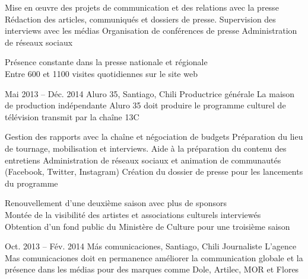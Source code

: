 \documentclass[30pt, french]{tccv}
\begin{document}
\begin{upshape}
\begin{experience}
    \setlength{\parskip}{-10pt}
    \begin{itemize}
      \setlength\itemsep{-3pt} 
      \cvitem[\checkmark] Mise en œuvre des projets de communication et des relations avec la presse
      \cvitem[\checkmark] Rédaction des articles, communiqués et dossiers de presse. Supervision des interviews avec les médias
      \cvitem[\checkmark] Organisation de conférences de presse
      \cvitem[\checkmark] Administration de réseaux sociaux
    \end{itemize}     
 Présence constante dans la presse nationale et régionale  \\
\mission{}          Entre 600 et 1100 visites quotidiennes sur le site web 
    
    
    
\setlength{\parskip}{0pt}        
\item{Mai 2013 -- Déc. 2014}
     {Aluro 35, Santiago, Chili}
     {Productrice générale}
     \fontsize{9pt}{1em}\color{text}\bodyfontlight\upshape\selectfont
%
 La maison de production indépendante Aluro 35 doit produire le programme culturel de télévision  transmit par la chaîne 13C \\
    
    \setlength{\parskip}{-10pt}
    \begin{itemize}
      \setlength\itemsep{-3pt} 
      \cvitem[\checkmark] Gestion des rapports avec la chaîne et négociation de budgets                       
      \cvitem[\checkmark] Préparation du lieu de tournage, mobilisation et interviews. Aide à la préparation du contenu des entretiens 
      \cvitem[\checkmark] Administration de réseaux sociaux et animation de communautés (Facebook, Twitter, Instagram)                 
      \cvitem[\checkmark] Création du dossier de presse pour les lancements du programme                                               
    \end{itemize}     
 Renouvellement d'une deuxième saison avec plus de sponsors \\
\mission{}	       Montée de la visibilité des artistes et associations culturels interviewés \\
\mission{}           Obtention d’un fond public du Ministère de Culture pour une troisième saison  \\




\setlength{\parskip}{0pt}    
\item{Oct. 2013 -- Fév. 2014 }     
  {Más comunicaciones, Santiago, Chili}     
  {Journaliste}
     \fontsize{9pt}{1em}\color{text}\bodyfontlight\upshape\selectfont
%    
 L’agence Mas comunicaciones doit en permanence améliorer la communication globale et la présence dans les médias
pour des marques comme Dole, Artilec, MOR et Flores\\


\end{experience}
\end{upshape}
\end{document}
